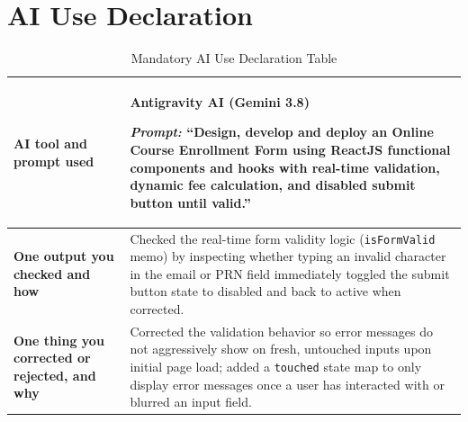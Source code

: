 \documentclass[11pt,a4paper]{article}
\begin{document}
\section{AI Use Declaration}

\begin{table}[htbp]
\centering
\renewcommand{\arraystretch}{1.5}
\begin{tabularx}{\textwidth}{|p{4.5cm}|X|}
\hline
\textbf{AI tool and prompt used} & \textbf{Antigravity AI (Gemini 3.8)}\par
\textit{Prompt:} ``Design, develop and deploy an Online Course Enrollment Form using ReactJS functional components and hooks with real-time validation, dynamic fee calculation, and disabled submit button until valid.'' \\ \hline
\textbf{One output you checked and how} & Checked the real-time form validity logic (\texttt{isFormValid} memo) by inspecting whether typing an invalid character in the email or PRN field immediately toggled the submit button state to disabled and back to active when corrected. \\ \hline
\textbf{One thing you corrected or rejected, and why} & Corrected the validation behavior so error messages do not aggressively show on fresh, untouched inputs upon initial page load; added a \texttt{touched} state map to only display error messages once a user has interacted with or blurred an input field. \\ \hline
\end{tabularx}
\caption{Mandatory AI Use Declaration Table}
\end{table}
\end{document}
